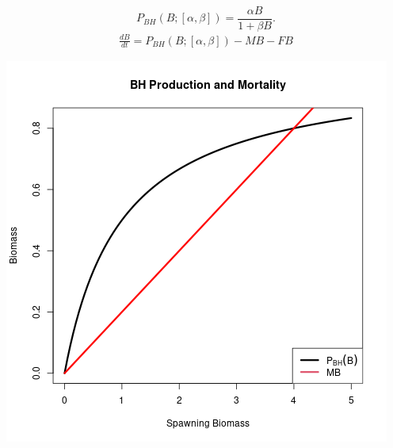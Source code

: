 \documentclass[ xcolor = pdftex, dvipsnames, table ]{beamer}
\begin{document}

%
\begin{frame}
\begin{equation*}
P_{BH}(B;[\alpha, \beta]) = \frac{\alpha B}{1+\beta B}.
\end{equation*}
\begin{align*}
\frac{dB}{dt} = P_{BH}(B;[\alpha, \beta]) -MB -FB %
\end{align*}
\begin{minipage}[h!]{0.49\textwidth}
        \includegraphics[width=\textwidth]{../../gpBias/pBHandM.png}
\end{minipage}
\begin{minipage}[h!]{0.49\textwidth}

\end{minipage}
\end{frame}
\end{document}
